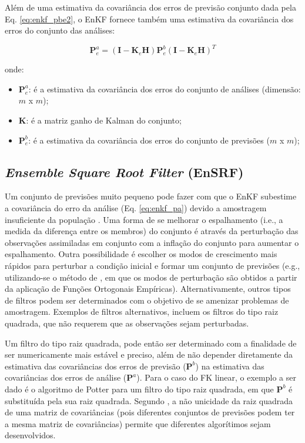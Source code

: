 Além de uma estimativa da covariância dos erros de previsão conjunto dada pela Eq. \ref{eq:enkf_pbe2}, o EnKF fornece também uma estimativa da covariância dos erros do conjunto das análises:

\begin{equation}
    \label{eq:enkf_pae}
    \mathbf{P}^{a}_{e} = (\mathbf{I}-\mathbf{K}_{e}\mathbf{H}){\mathbf{P}^{b}_{e}}(\mathbf{I}-\mathbf{K}_{e}\mathbf{H})^{T}
\end{equation}

onde:

\begin{itemize}
    \item $\mathbf{P}^{a}_{e}$: é a estimativa da covariância dos erros do conjunto de análises (dimensão: $m$ x $m$);
    \item $\mathbf{K}$: é a matriz ganho de Kalman do conjunto;
    \item $\mathbf{P}^{b}_{e}$: é a estimativa da covariância dos erros do conjunto de previsões ($m$ x $m$);
\end{itemize}

\subsection{\textit{Ensemble Square Root Filter} (EnSRF)}
\label{sec:ensrf}

Um conjunto de previsões muito pequeno pode fazer com que o EnKF subestime a covariância do erro da análise (Eq. \ref{eq:enkf_pa}) devido a amostragem insuficiente da população \cite{okaneefrederiksen/2008}. Uma forma de se melhorar o espalhamento (i.e., a medida da diferença entre os membros) do conjunto é através da perturbação das observações assimiladas em conjunto com a inflação do conjunto para aumentar o espalhamento. Outra possibilidade é escolher os modos de crescimento mais rápidos para perturbar a condição inicial e  formar um conjunto de previsões (e.g., utilizando-se o método de , em que os modos de perturbação são obtidos a partir da aplicação de Funções Ortogonais Empíricas). Alternativamente, outros tipos de filtros podem ser determinados com o objetivo de se amenizar problemas de amostragem. Exemplos de filtros alternativos, incluem os filtros do tipo raiz quadrada, que não requerem que as observações sejam perturbadas.

Um filtro do tipo raiz quadrada, pode então ser determinado com a finalidade de ser numericamente mais estável e preciso, além de não depender diretamente da estimativa das covariâncias dos erros de previsão ($\mathbf{P}^{b}$) na estimativa das covariâncias dos erros de análise ($\mathbf{P}^{a}$). Para o caso do FK linear, o exemplo a ser dado é o algoritmo de Potter \cite{potterestern/1963} para um filtro do tipo raiz quadrada, em que $\mathbf{P}^{b}$ é substituída pela sua raiz quadrada. Segundo , a não unicidade da raiz quadrada de uma matriz de covariâncias (pois diferentes conjuntos de previsões podem ter a mesma matriz de covariâncias) permite que diferentes algorítimos sejam desenvolvidos.

